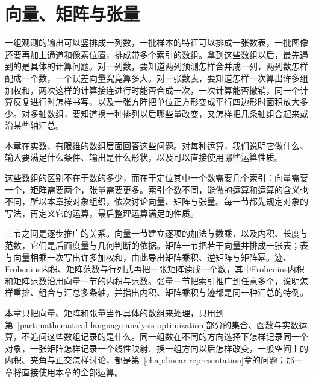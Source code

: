 \chapter{向量、矩阵与张量}
\label{chap:linear-operations}

一组观测的输出可以竖排成一列数，一批样本的特征可以排成一张数表，一批图像还要再加上通道和像素位置，排成带多个索引的数组。拿到这些数组以后，最先遇到的是具体的计算问题。对一列数，要知道两列预测怎样合并成一列，两列数怎样配成一个数，一个误差向量究竟算多大。对一张数表，要知道怎样一次算出许多组加权和，两次这样的计算接连进行时能否合成一次，一次计算能否撤销，同一个计算反复进行时怎样书写，以及一张方阵把单位正方形变成平行四边形时面积放大多少。对多轴数组，要知道换一种排列以后哪些量改变，又怎样把几条轴组合起来或沿某些轴汇总。

本章在实数、有限维的数组层面回答这些问题。对每种运算，我们说明它做什么、输入要满足什么条件、输出是什么形状，以及可以直接使用哪些运算性质。

这些数组的区别不在于数的多少，而在于定位其中一个数需要几个索引：向量需要一个，矩阵需要两个，张量需要更多。索引个数不同，能做的运算和运算的含义也不同，所以本章按对象组织，依次讨论向量、矩阵与张量。每一节都先规定对象的写法，再定义它的运算，最后整理运算满足的性质。

三节之间是逐步推广的关系。向量一节建立逐项的加法与数乘，以及内积、长度与范数，它们是后面度量与几何判断的依据。矩阵一节把若干向量并排成一张表；表与向量相乘一次写出许多加权和，由此导出矩阵乘积、逆矩阵与矩阵幂。迹、Frobenius内积、矩阵范数与行列式再把一张矩阵读成一个数，其中Frobenius内积和矩阵范数沿用向量一节的内积与范数。张量一节把索引推广到任意多个，说明怎样重排、组合与汇总多条轴，并指出内积、矩阵乘积与迹都是同一种汇总的特例。

本章只把向量、矩阵和张量当作具体的数组来处理，只用到第~\ref{part:mathematical-language-analysis-optimization}部分的集合、函数与实数运算，不追问这些数组记录的是什么。同一组数在不同的方向选择下怎样记录同一个对象，一张矩阵怎样记录一个线性映射、换一组方向以后怎样改变，一般空间上的内积、夹角与正交怎样讨论，都是第~\ref{chap:linear-representation}章的问题；那一章将直接使用本章的全部运算。






